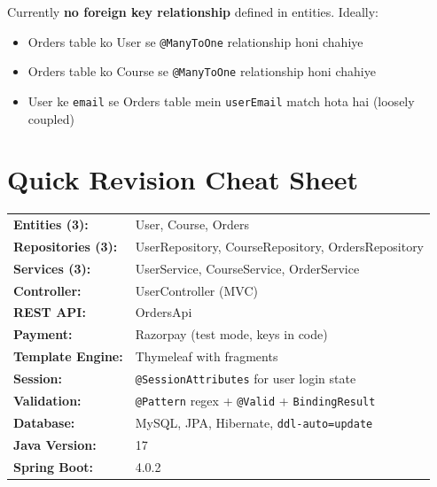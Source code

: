 \documentclass[12pt,a4paper]{article}
\begin{document}
\begin{answerbox}
Currently \textbf{no foreign key relationship} defined in entities. Ideally:
\begin{itemize}
    \item Orders table ko User se \texttt{@ManyToOne} relationship honi chahiye
    \item Orders table ko Course se \texttt{@ManyToOne} relationship honi chahiye
    \item User ke \texttt{email} se Orders table mein \texttt{userEmail} match hota hai (loosely coupled)
\end{itemize}
\end{answerbox}

\section{Quick Revision Cheat Sheet}

\begin{center}
\begin{tcolorbox}[colback=answerbox, colframe=primaryblue, title={\large\bfseries Quick Revision Points}, fonttitle=\color{white}, coltitle=white, width=\textwidth]

\begin{tabular}{>{\bfseries}l p{10cm}}
Entities (3): & User, Course, Orders \\[3pt]
Repositories (3): & UserRepository, CourseRepository, OrdersRepository \\[3pt]
Services (3): & UserService, CourseService, OrderService \\[3pt]
Controller: & UserController (MVC) \\[3pt]
REST API: & OrdersApi \\[3pt]
Payment: & Razorpay (test mode, keys in code) \\[3pt]
Template Engine: & Thymeleaf with fragments \\[3pt]
Session: & \texttt{@SessionAttributes} for user login state \\[3pt]
Validation: & \texttt{@Pattern} regex + \texttt{@Valid} + \texttt{BindingResult} \\[3pt]
Database: & MySQL, JPA, Hibernate, \texttt{ddl-auto=update} \\[3pt]
Java Version: & 17 \\[3pt]
Spring Boot: & 4.0.2 \\[3pt]
\end{tabular}

\end{tcolorbox}
\end{center}
\end{document}
